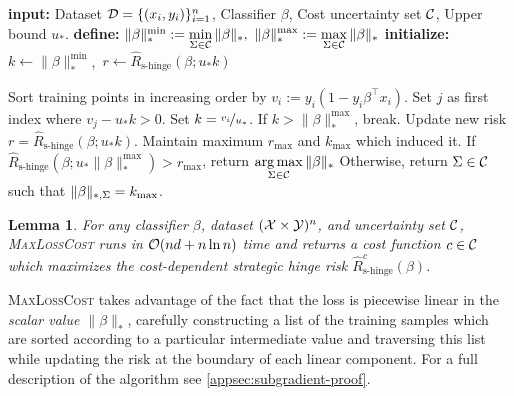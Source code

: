 \documentclass{article}
\newcommand{\costmatrix}{\Sigma}
\newcommand{\costset}{\gC}
\newcommand{\costfunc}{c}
\newcommand{\shingeemprisk}{\hat R_{\textrm{s-hinge}}}
\newcommand{\uinv}{\ensuremath{u_{*}}}
\newcommand{\dualnorm}[1]{\|#1\|_{*}}
\newcommand{\psdnorm}[2]{\matrixnorm{#1}{#2}}
\newcommand{\dualpsdnorm}[2]{\psdnorm{#1}{*,#2}}
\newcommand{\cinc}{{\costfunc\in\costset}}
\newtheorem{lemma}[theorem]{Lemma}
\theoremstyle{definition}
\begin{document}
\setlength{\textfloatsep}{18pt}
\begin{algorithm}[t]
\caption{Pseudocode for \textsc{MaxLossCost}}
\label{alg:maxlosscost}
\begin{algorithmic}
\STATE \textbf{input:} Dataset ${\mathcal{D}} = \{(x_i, y_i)\}_{i=1}^n$, Classifier $\beta$, Cost uncertainty set $\costset$, Upper bound $\uinv$.
\STATE \textbf{define:} $\dualnorm{\beta}^{\min} := \displaystyle \min_{\costmatrix \in \costset}  \dualnorm{\beta},\ \dualnorm{\beta}^{\max} := \displaystyle \max_{\costmatrix \in \costset} \dualnorm{\beta}$
\STATE \textbf{initialize:} $k \gets \dualnorm{\beta}^{\min}$,\ $r \gets \shingeemprisk(\beta; \uinv k)$
\begin{ALC@g}
    \STATE Sort training points in increasing order by $v_i := y_i (1 - y_i \beta^\top x_i)$.
    \STATE Set $j$ as first index where $v_j - \uinv k > 0$.
    \STATE Set $k = \nicefrac{v_i}{\uinv}$.
    \STATE If $k > \dualnorm{\beta}^{\max}$, break.
    \STATE Update new risk $r = \shingeemprisk(\beta; \uinv k)$. Maintain maximum $r_{\max}$ and $k_{\max}$ which induced it.
    \ENDFOR
    \STATE If $\shingeemprisk(\beta; \uinv \dualnorm{\beta}^{\max})\! >\! r_{\max}$, return $\displaystyle \argmax_{\costmatrix \in \costset} \dualnorm{\beta}$
    \STATE Otherwise, return $\costmatrix\in\costset$ such that $\dualpsdnorm{\beta}{\costmatrix} = k_{\max}$.
\end{ALC@g}
\end{algorithmic}
\end{algorithm}

\begin{lemma}
    \label{lemma:solve-max}
    For any classifier $\beta$, dataset $({\mathcal{X}}\times{\mathcal{Y}})^{n}$, and uncertainty set $\costset$,
    \textsc{MaxLossCost} runs in ${\mathcal{O}}(nd + n\ln n)$ time and returns a cost function $\cinc$ which maximizes the cost-dependent strategic hinge risk $\shingeemprisk^c(\beta)$.
\end{lemma}
\textsc{MaxLossCost}
takes advantage of the fact that the loss is piecewise linear in the \emph{scalar value $\dualnorm{\beta}$}, carefully constructing a list of the training samples which are sorted according to a particular intermediate value and traversing this list while updating the risk at the boundary of each linear component.
For a full description of the algorithm see \cref{appsec:subgradient-proof}.
\end{document}
